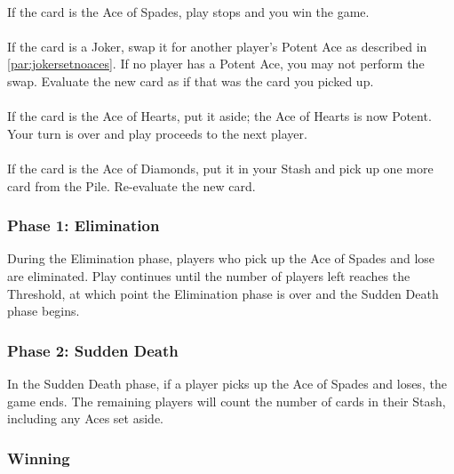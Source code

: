 \documentclass{article}
\begin{document}
\paragraph{}
If the card is the Ace of Spades, play stops and you win the game.

\paragraph{}
If the card is a Joker, swap it for another player's Potent Ace as
described in \ref{par:jokersetnoaces}. If no player has a Potent Ace,
you may not perform the swap. Evaluate the new card as if that was the
card you picked up.

\paragraph{}
If the card is the Ace of Hearts, put it aside; the Ace of Hearts is now
Potent. Your turn is over and play proceeds to the next player.

\paragraph{}
If the card is the Ace of Diamonds, put it in your Stash and pick up one
more card from the Pile. Re-evaluate the new card.


\subsubsection{Phase 1: Elimination}
\label{sec:elimination}

During the Elimination phase, players who pick up the Ace of Spades and
lose are eliminated. Play continues until the number of players left
reaches the Threshold, at which point the Elimination phase is over and
the Sudden Death phase begins.

\subsubsection{Phase 2: Sudden Death}
\label{sec:sd}

In the Sudden Death phase, if a player picks up the Ace of Spades and
loses, the game ends. The remaining players will count the number of
cards in their Stash, including any Aces set aside.

\subsubsection{Winning}
\end{document}
